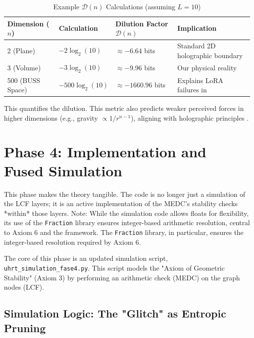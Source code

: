 \documentclass[11pt, a4paper]{article}
\begin{document}
		\begin{table}[H]
			\centering
			\caption{Example $\mathcal{D}(n)$ Calculations (assuming $L=10$)}
			\label{tab:metric_examples}
			\begin{tabular}{@{}llll@{}}
				\toprule
				\textbf{Dimension ($n$)} & \textbf{Calculation} & \textbf{Dilution Factor $\mathcal{D}(n)$} & \textbf{Implication} \\ \midrule
				2 (Plane) & $-2 \log_2(10)$ & $\approx -6.64$ bits & Standard 2D holographic boundary \\
				3 (Volume) & $-3 \log_2(10)$ & $\approx -9.96$ bits & Our physical reality \\
				500 (BUSS Space) & $-500 \log_2(10)$ & $\approx -1660.96$ bits & Explains LoRA failures in \cite{BUSS} \\ \bottomrule
			\end{tabular}
		\end{table}
		
		This quantifies the dilution. This metric also predicts weaker perceived forces in higher dimensions (e.g., gravity $\propto 1/r^{n-1}$), aligning with holographic principles \cite{bekenstein1973, bousso2002, thooft1993}.
		
		\section{Phase 4: Implementation and Fused Simulation}
		
		This phase makes the theory tangible. The code is no longer just a simulation of the LCF layers; it is an active implementation of the MEDC's stability checks *within* those layers. Note: While the simulation code allows floats for flexibility, its use of the \texttt{Fraction} library ensures integer-based arithmetic resolution, central to Axiom 6 and the \cite{Triadic} framework. The \texttt{Fraction} library, in particular, ensures the integer-based resolution required by Axiom 6.
		
		The core of this phase is an updated simulation script, \verb|uhrt_simulation_fase4.py|. This script models the "Axiom of Geometric Stability" (Axiom 3) by performing an arithmetic check (MEDC) on the graph nodes (LCF).
		
		\subsection{Simulation Logic: The "Glitch" as Entropic Pruning}
		
\end{document}
